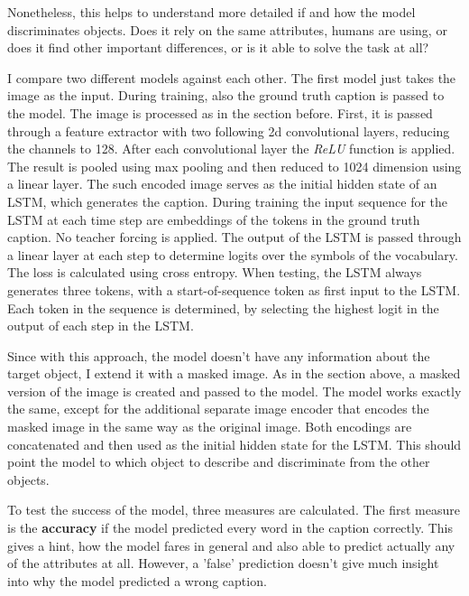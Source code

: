 Nonetheless, this helps to understand more detailed if and how the model discriminates objects.
Does it rely on the same attributes, humans are using, or does it find other important differences, or is it able to solve the task at all?

I compare two different models against each other.
The first model just takes the image as the input.
During training, also the ground truth caption is passed to the model.
The image is processed as in the section before.
First, it is passed through a feature extractor with two following 2d convolutional layers, reducing the channels to 128.
After each convolutional layer the \emph{ReLU} function is applied.
The result is pooled using max pooling and then reduced to 1024 dimension using a linear layer.
The such encoded image serves as the initial hidden state of an LSTM, which generates the caption.
During training the input sequence for the LSTM at each time step are embeddings of the tokens in the ground truth caption.
No teacher forcing is applied.
The output of the LSTM is passed through a linear layer at each step to determine logits over the symbols of the vocabulary.
The loss is calculated using cross entropy.
When testing, the LSTM always generates three tokens, with a start-of-sequence token as first input to the LSTM.
Each token in the sequence is determined, by selecting the highest logit in the output of each step in the LSTM.

Since with this approach, the model doesn't have any information about the target object, I extend it with a masked image.
As in the section above, a masked version of the image is created and passed to the model.
The model works exactly the same, except for the additional separate image encoder that encodes the masked image in the same way as the original image.
Both encodings are concatenated and then used as the initial hidden state for the LSTM.
This should point the model to which object to describe and discriminate from the other objects.

To test the success of the model, three measures are calculated.
The first measure is the \textbf{accuracy} if the model predicted every word in the caption correctly.
This gives a hint, how the model fares in general and also able to predict actually any of the attributes at all.
However, a 'false' prediction doesn't give much insight into why the model predicted a wrong caption.

